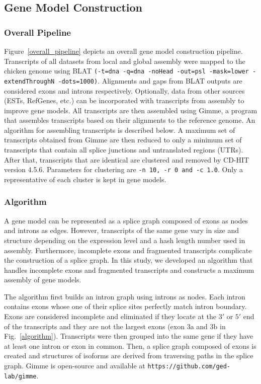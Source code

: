 \documentclass[10pt]{article}
\begin{document}
\subsection*{Gene Model Construction}

\subsubsection*{Overall Pipeline}

Figure~\ref{overall_pipeline} depicts an overall gene model construction pipeline.
Transcripts of all datasets from local and global assembly were mapped to the chicken genome using
BLAT\cite{Kent:2002tv} \texttt{(-t=dna -q=dna -noHead -out=psl -mask=lower -extendThroughN -dots=1000)}.
Alignments and gaps from BLAT outputs are considered exons and introns respectively.
Optionally, data from other sources (ESTs, RefGenes, etc.) can be incorporated with transcripts from assembly to improve gene models.
All transcripts are then assembled using Gimme, a program that assembles transcripts based on their alignments to the reference genome.
An algorithm for assembling transcripts is described below.
A maximum set of transcripts obtained from Gimme are then reduced to only a minimum set of transcripts that contain
all splice junctions and untranslated regions (UTRs).
After that, transcripts that are identical are clustered and removed by CD-HIT version 4.5.6\cite{Li:2006hr}.
Parameters for clustering are \texttt{-n 10, -r 0 and -c 1.0}.
Only a representative of each cluster is kept in gene models.

\subsubsection*{Algorithm}

A gene model can be represented as a splice graph composed of exons as nodes and introns as edges.
However, transcripts of the same gene vary in size and structure depending on the expression level and a hash length number used in assembly.
Furthermore, incomplete exons and fragmented transcripts complicate the construction of a splice graph.
In this study, we developed an algorithm that handles incomplete exons and fragmented transcripts and constructs a maximum assembly of gene models.

The algorithm first builds an intron graph using introns as nodes.
Each intron contains exons whose one of their splice sites perfectly match intron boundary.
Exons are considered incomplete and eliminated if they locate at the $3'$ or $5'$ end of the transcripts and
they are not the largest exons (exon 3a and 3b in Fig.~\ref{algorithm}).
Transcripts were then grouped into the same gene if they have at least one intron or exon in common.
Then, a splice graph composed of exons is created and structures of isoforms are derived from traversing paths in the splice graph.
Gimme is open-source and available at \texttt{https://github.com/ged-lab/gimme}.
\end{document}
